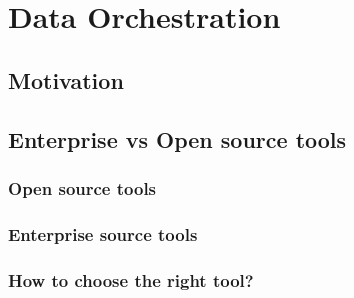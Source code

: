 \section{Data Orchestration}
\subsection{Motivation}
\subsection{Enterprise vs Open source tools}
\subsubsection{Open source tools}
\subsubsection{Enterprise source tools}
\subsubsection{How to choose the right tool?}